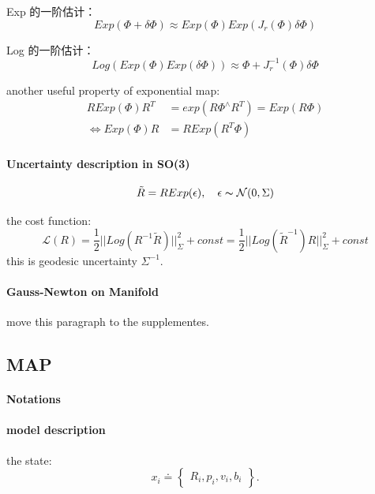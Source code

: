 \documentclass[10pt,a4paper]{article}
\begin{document}
Exp 的一阶估计：
\begin{equation}
Exp(\Phi + \delta \Phi)\approx Exp(\Phi)Exp(J_{r}(\Phi)\delta \Phi)
\end{equation}

Log 的一阶估计：
\begin{equation}
Log(Exp(\Phi)Exp(\delta \Phi))\approx \Phi + J_{r}^{-1}(\Phi)\delta \Phi
\end{equation}

another useful property of exponential map:
\begin{subequations}
	\begin{align}
	R Exp(\Phi) R^T &= exp(R \Phi ^{\wedge} R^T)=Exp(R\Phi)\\
	\Leftrightarrow Exp(\Phi) R &= R Exp(R^T \Phi)
	\end{align}
\end{subequations}

\paragraph{Uncertainty description in SO(3)}
\begin{equation}
\tilde{R} = R Exp(\epsilon), \quad \epsilon \thicksim \mathcal{N}(0, \Sigma)
\end{equation}

the cost function:
\begin{equation}
\mathcal{L}(R)=\frac{1}{2}||Log(R^{-1}\tilde{R})||_{\Sigma}^{2} + const = 
\frac{1}{2}||Log(\tilde{R}^{-1}) R||_{\Sigma}^{2} + const
\end{equation}
this is geodesic uncertainty $\Sigma^{-1}$.
\paragraph{Gauss-Newton on Manifold}
move this paragraph to the supplementes.

\subsection{MAP}
\paragraph{Notations}
\paragraph{model description}
the state:
\begin{equation}
x_{i} \doteq \begin{Bmatrix}
R_{i}, p_{i}, v_{i}, b_{i}
\end{Bmatrix}.
\end{equation}
\end{document}
